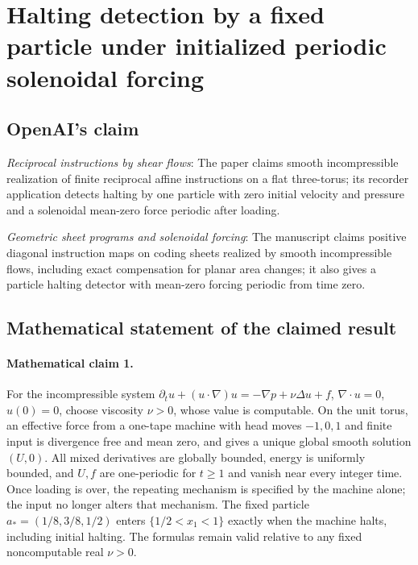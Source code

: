 \documentclass[11pt]{article}
\begin{document}
\section*{Halting detection by a fixed particle under initialized periodic solenoidal forcing}

\subsection{OpenAI's claim}
\textit{Reciprocal instructions by shear flows}: The paper claims smooth incompressible realization of finite reciprocal affine instructions on a flat three-torus; its recorder application detects halting by one particle with zero initial velocity and pressure and a solenoidal mean-zero force periodic after loading.

\textit{Geometric sheet programs and solenoidal forcing}: The manuscript claims positive diagonal instruction maps on coding sheets realized by smooth incompressible flows, including exact compensation for planar area changes; it also gives a particle halting detector with mean-zero forcing periodic from time zero.

\subsection{Mathematical statement of the claimed result}
\paragraph{Mathematical claim 1.} For the incompressible system $\partial_tu+(u\cdot\nabla)u=-\nabla p+\nu\Delta u+f$, $\nabla\cdot u=0$, $u(0)=0$, choose viscosity $\nu>0$, whose value is computable. On the unit torus, an effective force from a one-tape machine with head moves $-1,0,1$ and finite input is divergence free and mean zero, and gives a unique global smooth solution $(U,0)$. All mixed derivatives are globally bounded, energy is uniformly bounded, and $U,f$ are one-periodic for $t\ge1$ and vanish near every integer time. Once loading is over, the repeating mechanism is specified by the machine alone; the input no longer alters that mechanism. The fixed particle $a_*=(1/8,3/8,1/2)$ enters $\{1/2<x_1<1\}$ exactly when the machine halts, including initial halting. The formulas remain valid relative to any fixed noncomputable real $\nu>0$.
\end{document}
